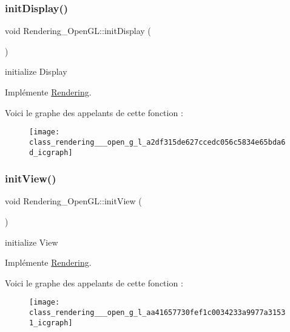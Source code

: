\subsubsection{\texorpdfstring{init\+Display()}{initDisplay()}}
{\footnotesize\ttfamily void Rendering\+\_\+\+Open\+G\+L\+::init\+Display (\begin{DoxyParamCaption}{ }\end{DoxyParamCaption})\hspace{0.3cm}{\ttfamily [virtual]}}



initialize Display 



Implémente \hyperlink{class_rendering_ae3ad4a7f4c5559cb258d72886123c3e0}{Rendering}.

Voici le graphe des appelants de cette fonction \+:\nopagebreak
\begin{figure}[H]
\begin{center}
\leavevmode
\texttt{[image: class\_rendering\_\_\_open\_g\_l\_a2df315de627ccedc056c5834e65bda6d\_icgraph]}
\end{center}
\end{figure}
\mbox{\label{class_rendering___open_g_l_aa41657730fef1c0034233a9977a31531}} 
\subsubsection{\texorpdfstring{init\+View()}{initView()}}
{\footnotesize\ttfamily void Rendering\+\_\+\+Open\+G\+L\+::init\+View (\begin{DoxyParamCaption}{ }\end{DoxyParamCaption})\hspace{0.3cm}{\ttfamily [virtual]}}



initialize View 



Implémente \hyperlink{class_rendering_abf05def5b7eb02669008cf44c3520dae}{Rendering}.

Voici le graphe des appelants de cette fonction \+:\nopagebreak
\begin{figure}[H]
\begin{center}
\leavevmode
\texttt{[image: class\_rendering\_\_\_open\_g\_l\_aa41657730fef1c0034233a9977a31531\_icgraph]}
\end{center}
\end{figure}
\mbox{\label{class_rendering___open_g_l_ac6c10061853d88c1ab6e40d6c172c69c}} 
